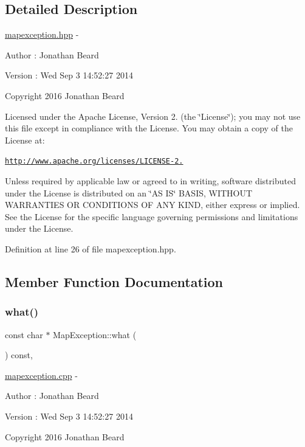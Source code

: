 \subsection{Detailed Description}
\hyperlink{mapexception_8hpp_source}{mapexception.\+hpp} -\/ \begin{DoxyAuthor}{Author}
\+: Jonathan Beard 
\end{DoxyAuthor}
\begin{DoxyVersion}{Version}
\+: Wed Sep 3 14\+:52\+:27 2014
\end{DoxyVersion}
Copyright 2016 Jonathan Beard

Licensed under the Apache License, Version 2. (the \char`\"{}\+License\char`\"{}); you may not use this file except in compliance with the License. You may obtain a copy of the License at\+:

\href{http://www.apache.org/licenses/LICENSE-2.0}{\tt http\+://www.\+apache.\+org/licenses/\+L\+I\+C\+E\+N\+S\+E-\/2.}

Unless required by applicable law or agreed to in writing, software distributed under the License is distributed on an \char`\"{}\+A\+S I\+S\char`\"{} B\+A\+S\+IS, W\+I\+T\+H\+O\+UT W\+A\+R\+R\+A\+N\+T\+I\+ES OR C\+O\+N\+D\+I\+T\+I\+O\+NS OF A\+NY K\+I\+ND, either express or implied. See the License for the specific language governing permissions and limitations under the License. 

Definition at line 26 of file mapexception.\+hpp.



\subsection{Member Function Documentation}
\hypertarget{class_map_exception_a4b9e4cce181943bf8c64ee831be2c10e}{}\label{class_map_exception_a4b9e4cce181943bf8c64ee831be2c10e} 
\subsubsection{\texorpdfstring{what()}{what()}}
{\footnotesize\ttfamily const char $\ast$ Map\+Exception\+::what (\begin{DoxyParamCaption}{ }\end{DoxyParamCaption}) const\hspace{0.3cm}{\ttfamily [virtual]}, {\ttfamily [noexcept]}}

\hyperlink{mapexception_8cpp_source}{mapexception.\+cpp} -\/ \begin{DoxyAuthor}{Author}
\+: Jonathan Beard 
\end{DoxyAuthor}
\begin{DoxyVersion}{Version}
\+: Wed Sep 3 14\+:52\+:27 2014
\end{DoxyVersion}
Copyright 2016 Jonathan Beard

